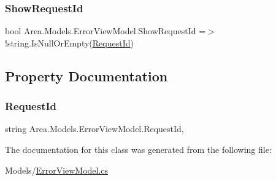 \subsubsection{\texorpdfstring{Show\+Request\+Id}{ShowRequestId}}
{\footnotesize\ttfamily bool Area.\+Models.\+Error\+View\+Model.\+Show\+Request\+Id =$>$ !string.\+Is\+Null\+Or\+Empty(\mbox{\hyperlink{classArea_1_1Models_1_1ErrorViewModel_aef67bef86ae4e1edfc14fb486dba1981}{Request\+Id}})}



\subsection{Property Documentation}
\mbox{\label{classArea_1_1Models_1_1ErrorViewModel_aef67bef86ae4e1edfc14fb486dba1981}} 
\subsubsection{\texorpdfstring{Request\+Id}{RequestId}}
{\footnotesize\ttfamily string Area.\+Models.\+Error\+View\+Model.\+Request\+Id\hspace{0.3cm}{\ttfamily [get]}, {\ttfamily [set]}}



The documentation for this class was generated from the following file\+:\begin{DoxyCompactItemize}
\item 
Models/\mbox{\hyperlink{ErrorViewModel_8cs}{Error\+View\+Model.\+cs}}\end{DoxyCompactItemize}
